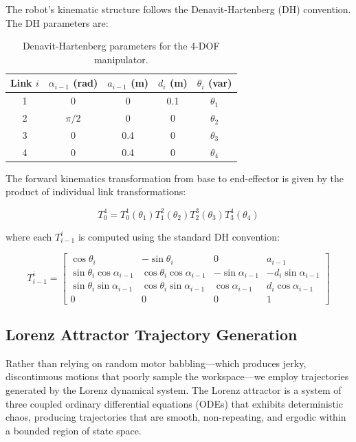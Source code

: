 \documentclass[12pt,a4paper,oneside]{report}
\begin{document}
The robot's kinematic structure follows the Denavit-Hartenberg (DH) convention. The DH parameters are:

\begin{table}[H]
\centering
\caption{Denavit-Hartenberg parameters for the 4-DOF manipulator.}
\label{tab:dh_parameters}
\begin{tabular}{ccccc}
\toprule
Link $i$ & $\alpha_{i-1}$ (rad) & $a_{i-1}$ (m) & $d_i$ (m) & $\theta_i$ (var) \\
\midrule
1 & 0 & 0 & 0.1 & $\theta_1$ \\
2 & $\pi/2$ & 0 & 0 & $\theta_2$ \\
3 & 0 & 0.4 & 0 & $\theta_3$ \\
4 & 0 & 0.4 & 0 & $\theta_4$ \\
\bottomrule
\end{tabular}
\end{table}

The forward kinematics transformation from base to end-effector is given by the product of individual link transformations:

\begin{equation}
T_{0}^{4} = T_{0}^{1}(\theta_1) T_{1}^{2}(\theta_2) T_{2}^{3}(\theta_3) T_{3}^{4}(\theta_4)
\end{equation}

where each $T_{i-1}^{i}$ is computed using the standard DH convention:

\begin{equation}
T_{i-1}^{i} = 
\begin{bmatrix}
\cos\theta_i & -\sin\theta_i & 0 & a_{i-1} \\
\sin\theta_i \cos\alpha_{i-1} & \cos\theta_i \cos\alpha_{i-1} & -\sin\alpha_{i-1} & -d_i \sin\alpha_{i-1} \\
\sin\theta_i \sin\alpha_{i-1} & \cos\theta_i \sin\alpha_{i-1} & \cos\alpha_{i-1} & d_i \cos\alpha_{i-1} \\
0 & 0 & 0 & 1
\end{bmatrix}
\end{equation}

\subsection{Lorenz Attractor Trajectory Generation}

Rather than relying on random motor babbling—which produces jerky, discontinuous motions that poorly sample the workspace—we employ trajectories generated by the Lorenz dynamical system. The Lorenz attractor is a system of three coupled ordinary differential equations (ODEs) that exhibits deterministic chaos, producing trajectories that are smooth, non-repeating, and ergodic within a bounded region of state space.
\end{document}
